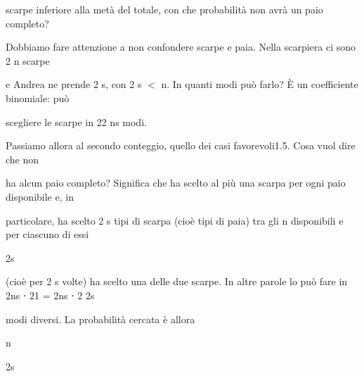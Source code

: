 \documentclass[a4paper,portrait,12pt]{article}
\begin{document}
\begin{flushleft}
scarpe inferiore alla met\`{a} del totale, con che probabilit\`{a} non avr\`{a} un paio completo?
\end{flushleft}


\begin{flushleft}
Dobbiamo fare attenzione a non confondere scarpe e paia. Nella scarpiera ci sono 2 n scarpe
\end{flushleft}


\begin{flushleft}
e Andrea ne prende 2 s, con 2 s $<$ n. In quanti modi pu\`{o} farlo? \`{E} un coefficiente binomiale: pu\`{o}
\end{flushleft}


\begin{flushleft}
scegliere le scarpe in 22 ns modi.
\end{flushleft}


\begin{flushleft}
Passiamo allora al secondo conteggio, quello dei casi favorevoli1.5. Cosa vuol dire che non
\end{flushleft}


\begin{flushleft}
ha alcun paio completo? Significa che ha scelto al più una scarpa per ogni paio disponibile e, in
\end{flushleft}


\begin{flushleft}
particolare, ha scelto 2 s tipi di scarpa (cio\`{e} tipi di paia) tra gli n disponibili e per ciascuno di essi
\end{flushleft}


\begin{flushleft}
2s
\end{flushleft}


\begin{flushleft}
(cio\`{e} per 2 s volte) ha scelto una delle due scarpe. In altre parole lo pu\`{o} fare in 2ns ⋅ 21 = 2ns ⋅ 2 2s
\end{flushleft}


\begin{flushleft}
modi diversi. La probabilit\`{a} cercata \`{e} allora
\end{flushleft}


\begin{flushleft}
n
\end{flushleft}


\begin{flushleft}
2s
\end{flushleft}
\end{document}
